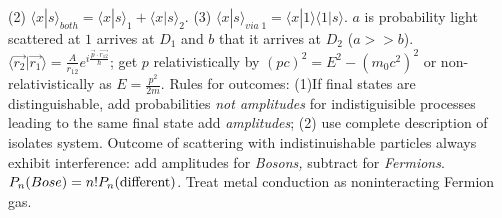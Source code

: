 (2) $ \langle x|s \rangle_{both}=  \langle x|s \rangle_{1} +  \langle x|s \rangle_{2}$.
(3) $ \langle x|s \rangle_{via \; 1}=  \langle x|1 \rangle   \langle 1|s \rangle $. $a$ is probability light scattered at $1$ arrives at
$D_1$ and $b$ that it arrives at $D_2$ ($a>>b$).  
$ \langle {\vec {r_2}} | {\vec {r_1}} \rangle 
= {\frac A {r_{12}}} e^{i {\frac {{\vec p} \cdot {\vec {r_{12}}}} {\hbar}}}$; get $p$
relativistically by  $(pc)^2=E^2-(m_0 c^2)^2$ or non-relativistically as $E={\frac {p^2} {2m}}$.
Rules for outcomes: (1)If final states are distinguishable, add probabilities \emph {not amplitudes}
for indistiguisible processes leading to the same final state add \emph {amplitudes};
(2) use complete description of isolates system.  Outcome of scattering with indistinuishable
particles always exhibit interference: 
add amplitudes for \emph{Bosons,} subtract for \emph{Fermions}.
$P_n(Bose)= n!P_n(\textnormal{different})$.  
Treat metal conduction as noninteracting Fermion gas.

